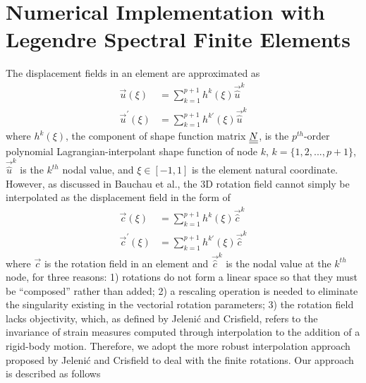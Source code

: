 \section{Numerical Implementation with Legendre Spectral Finite Elements}
The displacement fields in an element are approximated as
\begin{align}
    \label{InterpolateDisp}
    \vec{u}(\xi) &= \sum_{k=1}^{p+1} h^k(\xi) \vec{\hat{u}}^k \\
    \label{InterpolateDispp}
    \vec{u}^\prime(\xi) &= \sum_{k=1}^{p+1} h^{k\prime}(\xi) \vec{\hat{u}}^k
\end{align}
where $h^k(\xi)$, the component of shape function matrix $\underline{\underline{N}}$, is the $p^{th}$-order polynomial
Lagrangian-interpolant shape function of node $k$, $k=\{1,2,...,p+1\}$, 
$\vec{\hat{u}}^k$ is
the $k^{th}$ nodal value, and $\xi \in \left[-1,1\right]$ is the element
natural coordinate.
However, as discussed in Bauchau et al.\cite{Bauchau-etal:2008}, the 
3D rotation field cannot simply be interpolated as the displacement field in the form of
\begin{align}
    \label{InterpolateRot}
    \vec{c}(\xi) &= \sum_{k=1}^{p+1} h^k(\xi) \vec{\hat{c}}^k \\
    \label{InterpolateRotp}
    \vec{c}^\prime(\xi) &= \sum_{k=1}^{p+1} h^{k \prime}(\xi) \vec{\hat{c}}^k 
\end{align}    
where $\vec{c}$ is the rotation field in an element and $\vec{\hat{c}}^k$ is
the nodal value at the $k^{th}$ node, for three reasons: 1) rotations do not
form a linear space so that they must be  ``composed'' rather than added; 2)
a rescaling operation is needed to eliminate the singularity existing in the
vectorial rotation parameters; 3) the rotation field lacks objectivity,
which, as
defined by Jeleni\'c and Crisfield\cite{Crisfield1999}, refers to the
invariance of strain measures computed through interpolation to the addition
of a rigid-body motion. Therefore, we adopt the more robust interpolation
approach proposed by Jeleni\'c and Crisfield\cite{Crisfield1999} to deal
with the finite rotations. Our approach is described as follows
